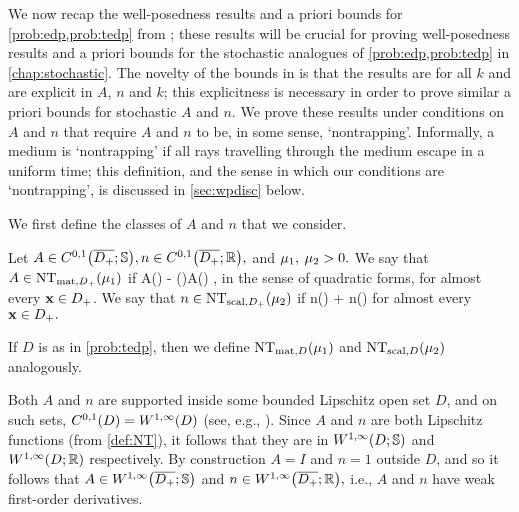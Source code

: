   We  now recap the well-posedness results and a priori bounds for \cref{prob:edp,prob:tedp} from \cite{GrPeSp:19}; these results will be crucial for proving well-posedness results and a priori bounds for the stochastic analogues of \cref{prob:edp,prob:tedp} in \cref{chap:stochastic}. The novelty of the bounds in \cite{GrPeSp:19} is that the results are for all $k$ and are explicit in $A$, $n$ and $k$; this explicitness is necessary in order to prove similar a priori bounds for stochastic $A$ and $n$. We prove these results under conditions on $A$ and $n$ that require $A$ and $n$ to be, in some sense, `nontrapping'. Informally, a medium is `nontrapping' if all rays travelling through the medium escape in a uniform time; this definition, and the sense in which our conditions are `nontrapping', is discussed in \cref{sec:wpdisc} below.

  We first define the classes of $A$ and $n$ that we consider.%

  
\label{def:NT}
Let $A \in \CzoDpclosRRdtd, n \in \CzoDpclosRR,$ and $\mu_{1},$ $\mu_{2} > 0.$ We say that $A \in \NTADp{\muo}$ if
\beq\label{eq:ANT}
A(\bx) - \mleft(\bx \cdot \grad\mright)A(\bx) \geq \muo,
\eeq
in the sense of quadratic forms, for almost every $\mathbf{x} \in D_{+}$. We say that $n \in \NTnDp{\mut}$ if
\beq\label{eq:nNT}
n(\bx) + \bx \cdot \grad n(\bx) \geq \mut
\eeq
for almost every $\mathbf{x} \in D_{+}.$

If $D$ is as in \cref{prob:tedp}, then we define $\NTAD{\muo}$ and $\NTnD{\mut}$ analogously.
\ede

Both $A$ and $n$ are supported inside some bounded Lipschitz open set $D$, and on such sets, $\CzoD = \WoiD$ (see, e.g., \cite[Section 4.2.3, Theorem 5]{EvGa:92}). Since $A$ and $n$ are both Lipschitz functions (from \cref{def:NT}), it follows that they are in $\WoiDRRdtd$ and $\WoiDRR$ respectively. By construction $A=I$ and $n=1$ outside $D$, and so it follows that $A \in \WoiDpclosRRdtd$ and $n \in \WoiDpclosRR,$ i.e., $A$ and $n$ have weak first-order derivatives.
\ere

